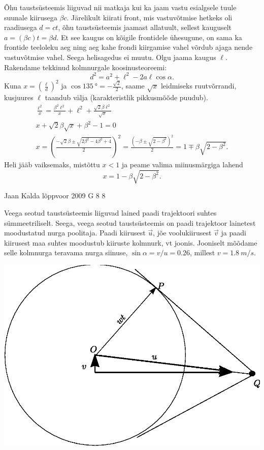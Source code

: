 \documentclass[11pt, twoside]{article}
\begin{document}
{{Õhu taustsüsteemis liiguvad nii matkaja kui ka jaam vastu esialgsele tuule suunale kiirusega $\beta c$. Järelikult kiirati front, mis vastuvõtmise hetkeks oli raadiusega $d = ct$, õhu taustsüsteemis jaamast allatuult, sellest kauguselt $a = (\beta c)t = \beta d$. Et see kaugus on kõigile frontidele ühesugune, on sama ka frontide teeloleku aeg ning aeg kahe frondi kiirgamise vahel võrdub ajaga nende vastuvõtmise vahel. Seega helisagedus ei muutu. Olgu jaama kaugus $\ell$. Rakendame tekkinud kolmnurgale koosinusteoreemi:
\[
d^{2}=a^{2}+\ell^{2}-2 a \ell \cos \alpha.
\]
Kuna $x = \left(\frac{\ell}{d}\right)^2$ ja $\cos \SI{135}{\degree}=-\frac{\sqrt{2}}{2}$, saame $\sqrt x$ leidmiseks ruutvõrrandi, kusjuures $\ell$ taandub välja (karakteristlik pikkusmõõde puudub).
\[
\begin{array}{c}{\frac{\ell^{2}}{x}=\frac{\beta^{2} \ell^{2}}{x}+\ell^{2}+\frac{\sqrt{2} \beta \ell^{2}}{\sqrt{x}}} \\ {x+\sqrt{2} \beta \sqrt{x}+\beta^{2}-1=0} \\ {x=\left(\frac{-\sqrt{2} \beta \pm \sqrt{2 \beta^{2}-4 \beta^{2}+4}}{2}\right)^{2}=\frac{\left(-\beta \pm \sqrt{2-\beta^{2}}\right)^{2}}{2}=1 \mp \beta \sqrt{2-\beta^{2}}.}\end{array}
\]
Heli jääb vaiksemaks, mistõttu $x < 1$ ja peame valima miinusmärgiga lahend
\[
x=1-\beta \sqrt{2-\beta^{2}}.
\]
\fi
}

{Jaan Kalda} %
{lõppvoor} %
{2009} %
{G 8} %
{8} %
{

\ifSolution
\osa
Veega seotud taustsüsteemis liiguvad lained paadi trajektoori suhtes sümmeetriliselt. Seega, veega seotud taustsüsteemis on
paadi trajektoor lainetest moodustatud nurga poolitaja. Paadi kiirusest $\vec u$, jõe voolukiirusest $\vec v$ ja paadi kiirusest maa suhtes moodustub kiiruste kolmnurk, vt joonis.
Jooniselt mõõdame selle kolmnurga teravama nurga siinuse, $\sin \alpha =v/u=\num{0.26}$, millest $v=\SI{1.8}{m/s}$.

\includegraphics[width=0.8\linewidth]{2009-v3g-08-paatlah.eps}

}}
\end{document}
